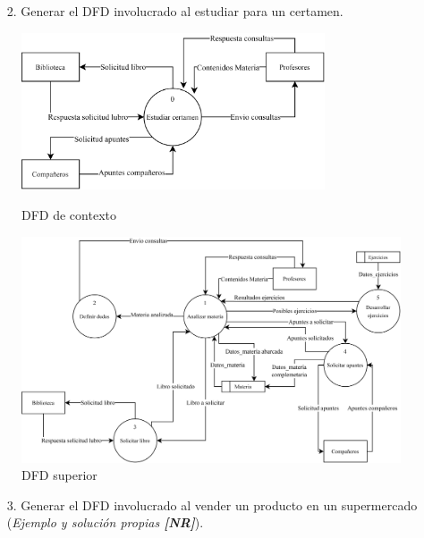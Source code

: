 \documentclass{templateNote}
\begin{document}
\newpage
\begin{enumerate}
    \item[2.] Generar el DFD involucrado al estudiar para un certamen.
\end{enumerate}
\begin{figure}[H]
    \centering
    \includegraphics[width=0.8\textwidth]{img/dfdcontexto2.png}
    \caption{DFD de contexto}
    \vspace{1cm}
    \includegraphics[width=1\textwidth]{img/dfdsuperior2.png}
    \caption{DFD superior}
\end{figure}
\newpage
\begin{enumerate}
    \item[3.] Generar el DFD involucrado al vender un producto en un supermercado (\textit{Ejemplo y solución propias \textbf{[NR]}}).
\end{enumerate}
\end{document}
